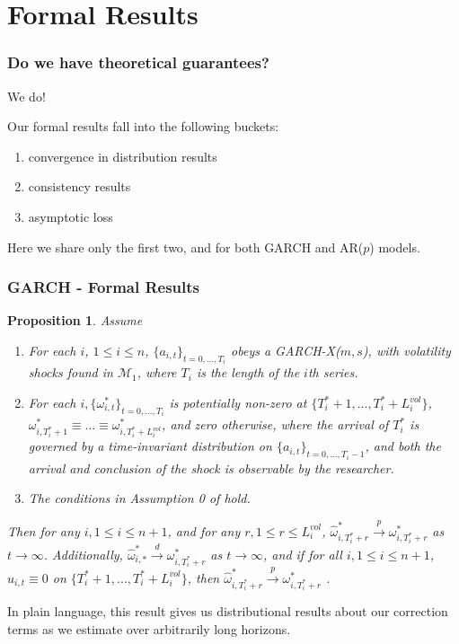 \documentclass[9pt]{beamer}
\def\mc#1{\mathcal{#1}} %
\def\mc#1{\mathcal{#1}}
\newtheorem{prop}{Proposition}
\theoremstyle{definition}
\begin{document}
\section{Formal Results}

\begin{frame}\frametitle{Do we have theoretical guarantees?}

    We do!

    \bigskip

    Our formal results fall into the following buckets:

    \begin{enumerate}
        \item convergence in distribution results
        \item consistency results
        \item asymptotic loss
    \end{enumerate}

Here we share only the first two, and for both GARCH and AR($p$) models.

\end{frame}

\begin{frame}\frametitle{GARCH - Formal Results}
        
\begin{prop}
    Assume
    \begin{enumerate}
      \item For each $i$, $1\leq i \leq n$, $\{a_{i,t}\}_{t=0,...,T_i}$ obeys a GARCH-X($m,s$), with volatility shocks found in $\mc{M}_{1}$, where $T_i$ is the length of the $i$th series.
      \item For each $i, \{\omega_{i,t}^{*}\}_{t=0,...,T_i}$ is potentially non-zero at $\{T^{*}_{i}+1,... ,T^{*}_{i}+L_{i}^{vol}\}$, $\omega_{i,T_{i}^{*}+1}^{*}\equiv...\equiv\omega_{i,T_{i}^{*}+L_{i}^{vol}}^{*}$, and zero otherwise, where the arrival of $T_{i}^{*}$ is governed by a time-invariant distribution on $\{a_{i,t}\}_{t=0,...,T_i-1}$, and both the arrival and conclusion of the shock is observable by the researcher. \label{stationarity_of_omega_i_t}
      \item The conditions in Assumption 0 of \cite{han2014asymptotic} hold.
    \end{enumerate}

    Then for any $i, 1\leq i \leq n+1$, and for any $r, 1\leq r \leq L_{i}^{vol}$, $\hat\omega_{i,T_{i}^{*}+r}^{*} \overset{p}{\longrightarrow} \omega_{i,T_{i}^{*}+r}^{*}$ as $t\rightarrow\infty$.  Additionally, $\hat\omega_{i,*}^{*} \overset{d}{\longrightarrow} \omega_{i,T_{i}^{*}+r}^{*}$ as $t\rightarrow\infty$, and if for all $i, 1 \leq i \leq n+ 1$, $u_{i,t} \equiv 0$ on $\{T^{*}_{i}+1,... ,T^{*}_{i}+L_{i}^{vol}\}$, then $\hat\omega_{i,T_{i}^{*}+r}^{*} \overset{p}{\longrightarrow} \omega_{i,T_{i}^{*}+r}^{*}$ .
    \end{prop}

    In plain language, this result gives us distributional results about our correction terms as we estimate over arbitrarily long horizons.

\end{frame}
    
\end{document}
